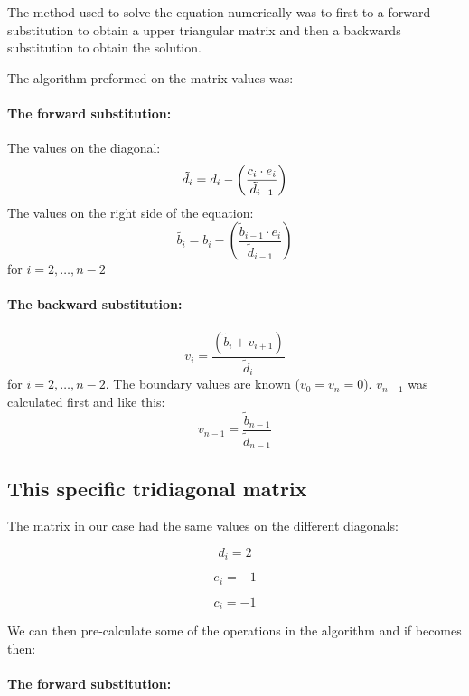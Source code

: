 The method used to solve the equation numerically was to first to a forward substitution to obtain a upper triangular matrix and then a backwards substitution to obtain the solution.

The algorithm preformed on the matrix values was:

\paragraph{The forward substitution:\hspace{4cm}}

\hspace{1cm}\linebreak
The values on the diagonal:
\[
\tilde{d_i} =  d_i - \left(\frac{c_i \cdot e_i}{\tilde{d}_{i-1}}\right)\linebreak
\]
The values on the right side of the equation:
\[
\tilde{b_i} =  b_i - \left(\frac{\tilde{b}_{i-1} \cdot e_i}{\tilde{d}_{i-1}}\right)
\]
for $i = 2, \dots, n-2 $

\paragraph{The backward substitution:\hspace{4cm}}

\hspace{1cm}\linebreak
\[
v_i = \frac{\left(\tilde{b}_i + v_{i+1}\right)}{\tilde{d}_i}
\]
for $i = 2, \dots, n-2 $. The boundary values are known ($v_0 = v_n = 0$). $v_{n-1}$ was calculated first and like this:
\[
v_{n-1} = \frac{\tilde{b}_{n-1}}{\tilde{d}_{n-1}}
\]

\subsection{This specific tridiagonal matrix}

The matrix in our case had the same values on the different diagonals:
\begin{multicols}{3}
\[
d_i = 2
\]

\[
e_i = -1
\]

\[
c_i = -1
\]
\end{multicols}

We can then pre-calculate some of the operations in the algorithm and if becomes then:

\paragraph{The forward substitution:\hspace{4cm}}

